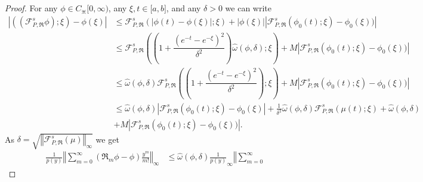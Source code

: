 \documentclass{amsart}
\theoremstyle{plain}
\numberwithin{equation}{section}
\begin{document}
\begin{proof}
For any $\phi \in C_{\divideontimes}[0,\infty)$, any $\xi,t\in \lbrack a,b]$, and
any $\delta>0$ we can write%
\begin{align*}
\left \vert ((%
\mathcal{F}%
_{P,\Re}^{s}\phi);\xi)-\phi \left(  \xi \right)  \right \vert  &  \leq%
\mathcal{F}%
_{P,\Re}^{s}(\left \vert \phi \left(  t\right)  -\phi \left(  \xi \right)
\right \vert ;\xi)+\left \vert \phi(\xi)\right \vert \left \vert
\mathcal{F}%
_{P,\Re}^{s}\left(  \phi_{0}(t);\xi \right)  -\phi_{0}(\xi))\right \vert \\
&  \leq%
\mathcal{F}%
_{P,\Re}^{s}\left(  \left(  1+\dfrac{\left(  e^{-t}-e^{-\xi}\right)  ^{2}%
}{\delta^{2}}\right)  \hat{\omega}(\phi,\delta);\xi \right)  +M\left \vert
\mathcal{F}%
_{P,\Re}^{s}\left(  \phi_{0}(t);\xi \right)  -\phi_{0}(\xi))\right \vert \\
&  \leq \hat{\omega}(\phi,\delta)%
\mathcal{F}%
_{P,\Re}^{s}\left(  \left(  1+\dfrac{\left(  e^{-t}-e^{-\xi}\right)  ^{2}%
}{\delta^{2}}\right)  ;\xi \right)  +M\left \vert
\mathcal{F}%
_{P,\Re}^{s}\left(  \phi_{0}(t);\xi \right)  -\phi_{0}(\xi))\right \vert \\
&  \leq \hat{\omega}(\phi,\delta)\left \vert
\mathcal{F}%
_{P,\Re}^{s}\left(  \phi_{0}(t);\xi \right)  -\phi_{0}(\xi)\right \vert
+\frac{1}{\delta^{2}}\hat{\omega}(\phi,\delta)%
\mathcal{F}%
_{P,\Re}^{s}\left(  \mu \left(  t\right)  ;\xi \right)  +\hat{\omega}%
(\phi,\delta)\\
&  +M\left \vert
\mathcal{F}%
_{P,\Re}^{s}\left(  \phi_{0}(t);\xi \right)  -\phi_{0}(\xi))\right \vert.
\end{align*}
As $\delta=\sqrt{\left \Vert
\mathcal{F}%
_{P,\Re}^{s}\left(  \mu\right)  \right \Vert _{\infty}}$ we
get
\begin{align*}
\frac{1}{p(y)}\left \Vert \sum \limits_{m=0}^{\infty}\left(  \Re_{m}\phi
-\phi \right)  \frac{y^{m}}{m!}\right \Vert _{\infty} &  \leq \hat{\omega}%
(\phi,\delta)\frac{1}{p(y)}_{\infty}\left \Vert \sum \limits_{m=0}^{\infty}%

\end{align*}
\end{proof}
\end{document}
